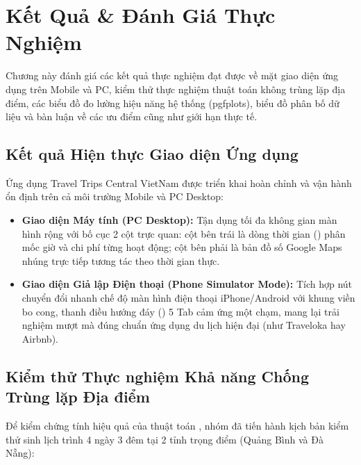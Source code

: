 \chapter{Kết Quả \& Đánh Giá Thực Nghiệm}

\begin{muctieu}
Chương này đánh giá các kết quả thực nghiệm đạt được về mặt giao diện ứng dụng trên Mobile và PC, kiểm thử thực nghiệm thuật toán không trùng lặp địa điểm, các biểu đồ đo lường hiệu năng hệ thống (pgfplots), biểu đồ phân bố dữ liệu và bàn luận về các ưu điểm cũng như giới hạn thực tế.
\end{muctieu}

\section{Kết quả Hiện thực Giao diện Ứng dụng}

Ứng dụng Travel Trips Central VietNam được triển khai hoàn chỉnh và vận hành ổn định trên cả môi trường Mobile và PC Desktop:

\begin{itemize}
    \item \textbf{Giao diện Máy tính (PC Desktop):} Tận dụng tối đa không gian màn hình rộng với bố cục 2 cột trực quan: cột bên trái là dòng thời gian () phân mốc giờ và chi phí từng hoạt động; cột bên phải là bản đồ số Google Maps nhúng trực tiếp tương tác theo thời gian thực.
    \item \textbf{Giao diện Giả lập Điện thoại (Phone Simulator Mode):} Tích hợp nút chuyển đổi nhanh chế độ màn hình điện thoại iPhone/Android với khung viền bo cong, thanh điều hướng đáy () 5 Tab cảm ứng một chạm, mang lại trải nghiệm mượt mà đúng chuẩn ứng dụng du lịch hiện đại (như Traveloka hay Airbnb).
\end{itemize}

\section{Kiểm thử Thực nghiệm Khả năng Chống Trùng lặp Địa điểm}

Để kiểm chứng tính hiệu quả của thuật toán , nhóm đã tiến hành kịch bản kiểm thử sinh lịch trình 4 ngày 3 đêm tại 2 tỉnh trọng điểm (Quảng Bình và Đà Nẵng):

